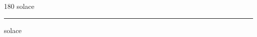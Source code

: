 
\begin{frame}
\begin{center}
\begin{turn}{180}
{\fontsize{2.5cm}{1em}\selectfont solace}
\end{turn}
\vspace{1em}\par  
\hrule
\vspace{1em}\par  
{\fontsize{2.5cm}{1em}\selectfont solace}
\end{center}
\end{frame}
